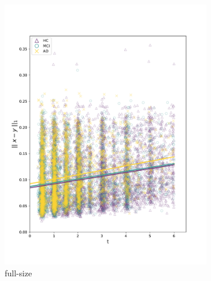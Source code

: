 \begin{figure}[h]
	\centering
	\begin{subfigure}{0.48\textwidth}
		\includegraphics[width=\linewidth, trim={10 30 30 30}, clip]{images/l1_diff_plots/brains} 
		\caption{full-size}
	\end{subfigure}
	\begin{subfigure}{0.48\textwidth}

\end{subfigure}
\end{figure}
